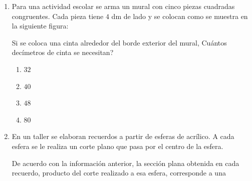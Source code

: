 \documentclass[12pt]{article}
\begin{document}
\begin{enumerate}[label=\textbf{\arabic*.}, itemsep=2.5cm]
De acuerdo con la informaci\'on anterior, la superficie de esa pieza decorativa, en metros cuadrados, es mayor que

\begin{enumerate}[label=\Alph*)]
  \item $22$ y menor que $23$.
  \item $18$ y menor que $20$.
  \item $16$ y menor que $18$.
  \item $24$ y menor que $26$.
\end{enumerate}

\Needspace{0.88\textheight}
\item
Para una actividad escolar se arma un mural con cinco piezas cuadradas congruentes. Cada pieza tiene $4$ dm de lado y se colocan como se muestra en la siguiente figura:

\begin{center}
\end{center}

Si se coloca una cinta alrededor del borde exterior del mural, \textquestiondown Cu\'antos dec\'imetros de cinta se necesitan?

\begin{enumerate}[label=\Alph*)]
  \item $32$
  \item $40$
  \item $48$
  \item $80$
\end{enumerate}

\Needspace{0.42\textheight}
\item
En un taller se elaboran recuerdos a partir de esferas de acr\'ilico. A cada esfera se le realiza un corte plano que pasa por el centro de la esfera.

De acuerdo con la informaci\'on anterior, la secci\'on plana obtenida en cada recuerdo, producto del corte realizado a esa esfera, corresponde a una


\end{enumerate}
\end{document}
